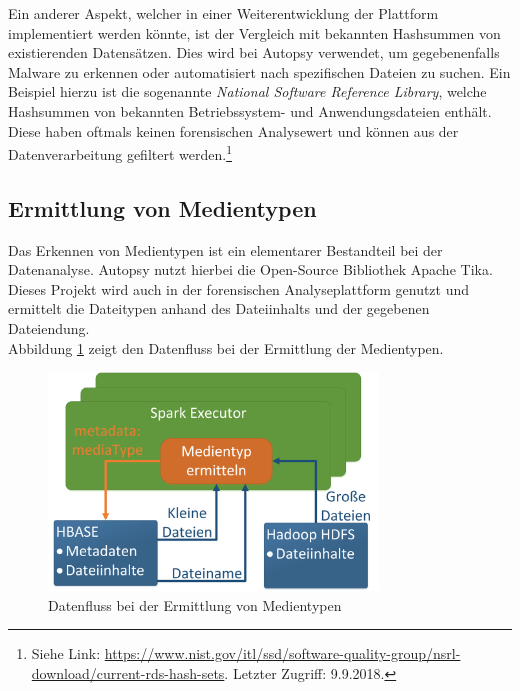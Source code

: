 \noindent
Ein anderer Aspekt, welcher in einer Weiterentwicklung der Plattform implementiert werden könnte, ist der Vergleich mit bekannten Hashsummen von existierenden Datensätzen. Dies wird bei Autopsy verwendet, um gegebenenfalls Malware zu erkennen oder automatisiert nach spezifischen Dateien zu suchen. Ein Beispiel hierzu ist die sogenannte \textit{National Software Reference Library}, welche Hashsummen von bekannten Betriebssystem- und Anwendungsdateien enthält. Diese haben oftmals keinen forensischen Analysewert und können aus der Datenverarbeitung gefiltert werden.\footnote{Siehe Link: \url{https://www.nist.gov/itl/ssd/software-quality-group/nsrl-download/current-rds-hash-sets}. Letzter Zugriff: 9.9.2018.} \cite[S. 36]{digital_forensics}

\subsection{Ermittlung von Medientypen}
\label{subsec:media_types}

Das Erkennen von Medientypen ist ein elementarer Bestandteil bei der Datenanalyse. Autopsy nutzt hierbei die Open-Source Bibliothek Apache Tika\texttrademark. Dieses Projekt wird auch in der forensischen Analyseplattform genutzt und ermittelt die Dateitypen anhand des Dateiinhalts und der gegebenen Dateiendung.\\
Abbildung \ref{fig:data_processing_media_types} zeigt den Datenfluss bei der Ermittlung der Medientypen.\\

\begin{figure}[ht]
  \centering
  \includegraphics[width=0.78\textwidth]{./resource/spark_processing_media_types.png}
  \caption{Datenfluss bei der Ermittlung von Medientypen}
  \label{fig:data_processing_media_types}
\end{figure}


